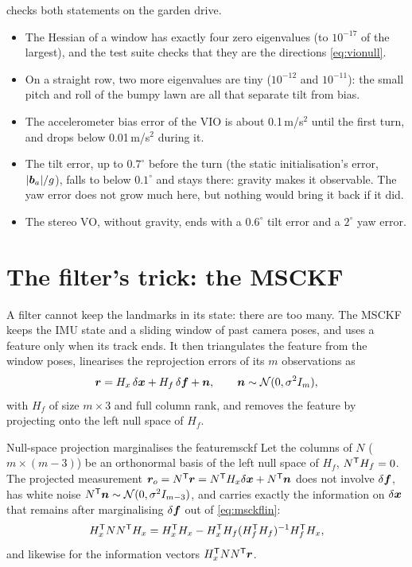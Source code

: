  checks both statements on the garden drive.
\begin{itemize}[nosep]
\item The Hessian of a window has exactly four zero eigenvalues (to
  $10^{-17}$ of the largest), and the test suite checks that they are the
  directions \eqref{eq:vionull}.
\item On a straight row, two more eigenvalues are tiny ($10^{-12}$ and
  $10^{-11}$): the small pitch and roll of the bumpy lawn are all that
  separate tilt from bias.
\item The accelerometer bias error of the VIO is about 0.1\,m/s$^2$
  until the first turn, and drops below 0.01\,m/s$^2$ during it.
\item The tilt error, up to $0.7^\circ$ before the turn (the static
  initialisation's error, $|\bm{b}_a|/g$), falls to below $0.1^\circ$
  and stays there: gravity makes it observable. The yaw error does not
  grow much here, but nothing would bring it back if it did.
\item The stereo VO, without gravity, ends with a $0.6^\circ$ tilt error
  and a $2^\circ$ yaw error.
\end{itemize}

\section{The filter's trick: the MSCKF}

A filter cannot keep the landmarks in its state: there are too many.
The MSCKF keeps the IMU state and a sliding window of past camera poses,
and uses a feature only when its track ends. It then triangulates the
feature from the window poses, linearises the reprojection errors of
its $m$ observations as
\begin{equation}\label{eq:msckflin}
\bm{r}=H_x\,\delta\bm{x}+H_f\,\delta\bm{f}+\bm{n},\qquad
\bm{n}\sim\mathcal{N}(0,\sigma^2I_{m}),
\end{equation}
with $H_f$ of size $m\times3$ and full column rank, and removes the
feature by projecting onto the left null space of $H_f$.

\begin{proposition}{Null-space projection marginalises the feature}{msckf}
Let the columns of $N$ ($m\times(m-3)$) be an orthonormal basis of the
left null space of $H_f$, $N^{\mathsf{T}} H_f=0$. The projected measurement
$\bm{r}_o=N^{\mathsf{T}}\bm{r}=N^{\mathsf{T}} H_x\delta\bm{x}+N^{\mathsf{T}}\bm{n}$ does not involve
$\delta\bm{f}$, has white noise $N^{\mathsf{T}}\bm{n}\sim\mathcal{N}(0,\sigma^2
I_{m-3})$, and carries exactly the information on $\delta\bm{x}$ that
remains after marginalising $\delta\bm{f}$ out of \eqref{eq:msckflin}:
\begin{equation}\label{eq:msckfeq}
H_x^{\mathsf{T}} NN^{\mathsf{T}} H_x=H_x^{\mathsf{T}} H_x-H_x^{\mathsf{T}} H_f(H_f^{\mathsf{T}} H_f)^{-1}H_f^{\mathsf{T}} H_x,
\end{equation}
and likewise for the information vectors $H_x^{\mathsf{T}} NN^{\mathsf{T}}\bm{r}$.
\end{proposition}

